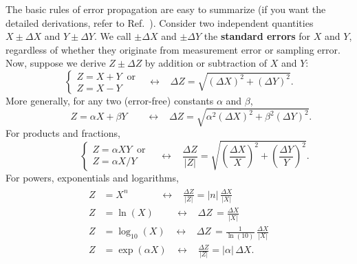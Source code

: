 \documentclass[11pt,a4paper]{article}
\begin{document}
The basic rules of error propagation are easy to summarize (if you
want the detailed derivations, refer to Ref.~\cite{Hughes}).  Consider
two independent quantities $X \pm \Delta X$ and $Y \pm \Delta Y$.  We
call $\pm\Delta X$ and $\pm \Delta Y$ the \textbf{standard errors} for
$X$ and $Y$, regardless of whether they originate from measurement
error or sampling error.  Now, suppose we derive $Z \pm \Delta Z$ by
addition or subtraction of $X$ and $Y$:
\begin{equation*}
  \left\{\begin{array}{l}Z = X + Y \;\;\mathrm{or}\\ Z = X - Y
  \end{array}  \right. \;\;\; \leftrightarrow \;\;\; \Delta Z = \sqrt{(\Delta X)^2 + (\Delta Y)^2}.
\end{equation*}
More generally, for any two (error-free) constants $\alpha$ and $\beta$,
\begin{equation*}
  \;\;\qquad Z = \alpha X + \beta Y \qquad \leftrightarrow \;\;\; \Delta Z = \sqrt{\alpha^2(\Delta X)^2 + \beta^2 (\Delta Y)^2}.
\end{equation*}
For products and fractions,
\begin{equation*}
  \quad\qquad\;\left\{\begin{array}{l}Z = \alpha XY \;\;\mathrm{or}\\ Z = \alpha X/Y
  \end{array}  \right. \quad \leftrightarrow \;\;\;
  \frac{\Delta Z}{|Z|} = \sqrt{\left(\frac{\Delta X}{X}\right)^2 + \left(\frac{\Delta Y}{Y}\right)^2}.
\end{equation*}
For powers, exponentials and logarithms,
\begin{align}
  \begin{aligned}
  Z &= X^n \quad\qquad\; \leftrightarrow \;\;\; \frac{\Delta Z}{|Z|} = |n| \,\frac{\Delta X}{|X|} \\
    Z &= \ln(X) \qquad\, \leftrightarrow \;\;\; \Delta Z \,= \frac{\Delta X}{|X|} \\
    Z &= \log_{10}(X) \;\;\; \leftrightarrow \;\;\; \Delta Z \, = \frac{1}{\ln(10)} \, \frac{\Delta X}{|X|} \\
    Z &= \exp(\alpha X) \;\;\; \leftrightarrow \;\;\; \frac{\Delta Z}{|Z|} = |\alpha|\,\Delta X.
  \end{aligned} \nonumber
\end{align}
\end{document}
